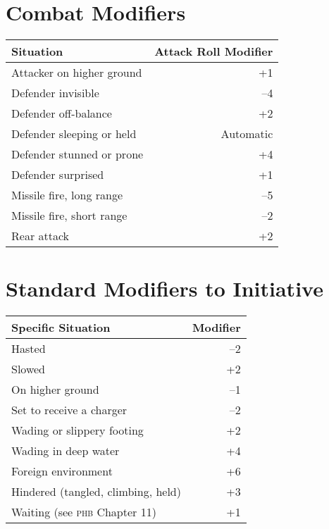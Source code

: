 \documentclass[10pt,letterpaper]{article}
\begin{document}
\noindent
\begin{minipage}[t]{0.495\textwidth}
  \section*{Combat Modifiers}
  \begin{tabularx}{\textwidth}{Xr}
    \toprule
    Situation & Attack Roll Modifier \\
    \midrule
    Attacker on higher ground & +1 \\
    Defender invisible & --4 \\
    Defender off-balance & +2 \\
    Defender sleeping or held & Automatic \\
    Defender stunned or prone & +4 \\
    Defender surprised & +1 \\
    Missile fire, long range & --5 \\
    Missile fire, short range & --2 \\
    Rear attack & +2 \\
    \bottomrule
  \end{tabularx}
\end{minipage}
\hfill
\begin{minipage}[t]{0.495\textwidth}
  \section*{Standard Modifiers to Initiative}
  \begin{tabularx}{\textwidth}{Xr}
    \toprule
    Specific Situation & Modifier \\
    \midrule
    Hasted & --2 \\
    Slowed & +2 \\
    On higher ground & --1 \\
    Set to receive a charger & --2 \\
    Wading or slippery footing & +2 \\
    Wading in deep water & +4 \\
    Foreign environment & +6 \\
    Hindered (tangled, climbing, held) & +3 \\
    Waiting (see {\scshape phb} Chapter 11) & +1 \\
    \bottomrule
  \end{tabularx}
\end{minipage}
\bigskip
\end{document}
